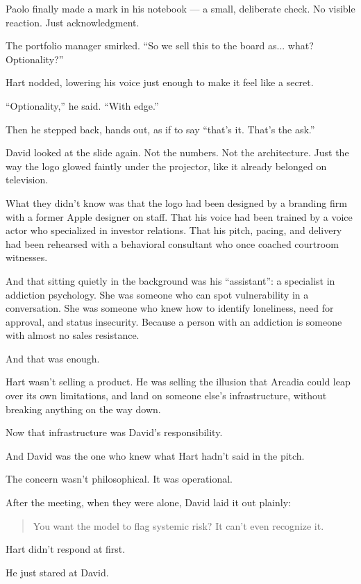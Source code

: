 Paolo finally made a mark in his notebook — a small, deliberate check. No visible reaction. Just acknowledgment.

The portfolio manager smirked. “So we sell this to the board as... what? Optionality?”

Hart nodded, lowering his voice just enough to make it feel like a secret.

“Optionality,” he said.  
“With edge.”

Then he stepped back, hands out, as if to say ``that’s it. That’s the ask.''

David looked at the slide again.  
Not the numbers.  
Not the architecture.  
Just the way the logo glowed faintly under the projector, like it already belonged on television.

What they didn’t know 
was that the logo had been designed by a branding firm with a former Apple designer on staff.
That his voice had been trained by a voice actor who specialized in investor relations.
That his pitch, pacing, and delivery had been rehearsed with a behavioral consultant who once coached courtroom witnesses.

And that sitting quietly in the background was his ``assistant'': a specialist in addiction psychology.
She was someone who can spot vulnerability in a conversation.
She was someone who knew how to identify loneliness, need for approval, and status insecurity.
Because a person with an addiction is someone with almost no sales resistance.

And that was enough.

Hart wasn’t selling a product.
He was selling the illusion that Arcadia could leap over its own limitations, and land on someone else’s infrastructure, 
without breaking anything on the way down.

Now that infrastructure was David’s responsibility.

And David was the one who knew what Hart hadn’t said in the pitch.

The concern wasn’t philosophical. It was operational.

After the meeting, when they were alone, David laid it out plainly:

\begin{quote}
  You want the model to flag systemic risk? It can’t even recognize it. 
\end{quote}

Hart didn’t respond at first.

He just stared at David.

